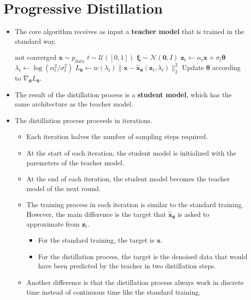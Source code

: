 \documentclass[10pt]{article}
\newcommand{\ve}[1]{\mathbf{#1}}
\newcommand{\ves}[1]{\boldsymbol{#1}}
\newcommand{\mcal}[1]{\mathcal{#1}}
\newcommand{\data}{\mathrm{data}}
\begin{document}
\section{Progressive Distillation}

\begin{itemize}
  \item The core algorithm receives as input a {\bf teacher model} that is trained in the standard way.
  
  \begin{codebox}
    \li \While not converged
    \li \Do
          $\ve{x} \sim p_{\data}$
    \li   $t \sim \mcal{U}([0,1])$
    \li   $\ves{\xi} \sim \mcal{N}(\ve{0}, I)$
    \li   $\ve{z}_t \leftarrow \alpha_t \ve{x} + \sigma_t \ves{\theta} $
    \li   $\lambda_t \leftarrow \log (\alpha_t^2 / \sigma_t^2)$
    \li   $L_{\ves{\theta}} \leftarrow w(\lambda_t) \| \ve{x} - \hat{\ve{x}}_{\ves{\theta}}(\ve{z}_t, \lambda_t) \|_2^2 $
    \li   Update $\ves{\theta}$ according to $\nabla_{\ves{\theta}} L_{\ves{\theta}}$.
        \End
  \end{codebox}

  \item The result of the distillation process is a {\bf student model}, which has the same architecture as the teacher model.
  
  \item The distillation process proceeds in iterations.
  \begin{itemize}
    \item Each iteration halves the number of sampling steps required.
    \item At the start of each iteration, the student model is initialized with the paremeters of the teacher model. 
    \item At the end of each iteration, the student model becomes the teacher model of the next round.
    \item The training process in each iteration is similar to the standard training. However, the main difference is the target that $\hat{\ve{x}}_{\ves{\theta}}$ is asked to approximate from $\ve{z}_t$.
    \begin{itemize}
      \item For the standard training, the target is $\ve{x}$.
      \item For the distillation process, the target is the denoised data that would have been predicted by the teacher in two distillation steps.
    \end{itemize}
    \item Another difference is that the distillation process always work in discrete time instead of continuous time like the standard training.
  \end{itemize}


\end{itemize}
\end{document}

